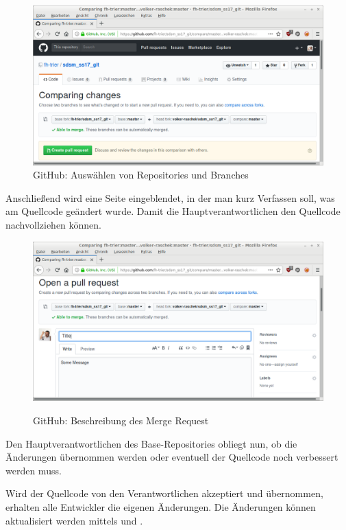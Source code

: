 \begin{figure}[H]
  \centering
  \includegraphics[width=1\textwidth]{img//pull-request2.png}
  \caption{GitHub: Auswählen von Repositories und Branches}
  \label{img:github-pull-request-select-branches}
\end{figure}

Anschließend wird eine Seite eingeblendet, in der man kurz Verfassen soll, was am Quellcode geändert wurde. Damit die Hauptverantwortlichen den Quellcode nachvollziehen können.

\begin{figure}[H]
  \centering
  \includegraphics[width=1\textwidth]{img//pull-request3.png}
  \label{img:github-pull-request-description}
  \caption{GitHub: Beschreibung des Merge Request}
\end{figure}

Den Hauptverantwortlichen des Base-Repositories obliegt nun, ob die Änderungen übernommen werden oder eventuell der Quellcode noch verbessert werden muss.

Wird der Quellcode von den Verantwortlichen akzeptiert und übernommen, erhalten alle Entwickler die eigenen Änderungen. Die Änderungen können aktualisiert werden mittels \textit{} und \textit{}.
